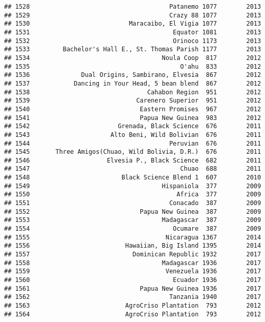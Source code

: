 \documentclass[
]{article}
\begin{document}
\begin{verbatim}
## 1528                                      Patanemo 1077        2013
## 1529                                      Crazy 88 1077        2013
## 1530                           Maracaibo, El Vigia 1077        2013
## 1531                                       Equator 1081        2013
## 1532                                       Orinoco 1173        2013
## 1533         Bachelor's Hall E., St. Thomas Parish 1177        2013
## 1534                                    Noula Coop  817        2012
## 1535                                         O'ahu  833        2012
## 1536              Dual Origins, Sambirano, Elvesia  867        2012
## 1537            Dancing in Your Head, 5 bean blend  867        2012
## 1538                                Cahabon Region  951        2012
## 1539                             Carenero Superior  951        2012
## 1540                              Eastern Promises  967        2012
## 1541                              Papua New Guinea  983        2012
## 1542                        Grenada, Black Science  676        2011
## 1543                      Alto Beni, Wild Bolivian  676        2011
## 1544                                      Peruvian  676        2011
## 1545       Three Amigos(Chuao, Wild Bolivia, D.R.)  676        2011
## 1546                     Elvesia P., Black Science  682        2011
## 1547                                         Chuao  688        2011
## 1548                         Black Science Blend 1  607        2010
## 1549                                    Hispaniola  377        2009
## 1550                                        Africa  377        2009
## 1551                                      Conacado  387        2009
## 1552                              Papua New Guinea  387        2009
## 1553                                    Madagascar  387        2009
## 1554                                       Ocumare  387        2009
## 1555                                     Nicaragua 1367        2014
## 1556                          Hawaiian, Big Island 1395        2014
## 1557                            Dominican Republic 1932        2017
## 1558                                    Madagascar 1936        2017
## 1559                                     Venezuela 1936        2017
## 1560                                       Ecuador 1936        2017
## 1561                              Papua New Guinea 1936        2017
## 1562                                      Tanzania 1940        2017
## 1563                          AgroCriso Plantation  793        2012
## 1564                          AgroCriso Plantation  793        2012

\end{verbatim}
\end{document}
